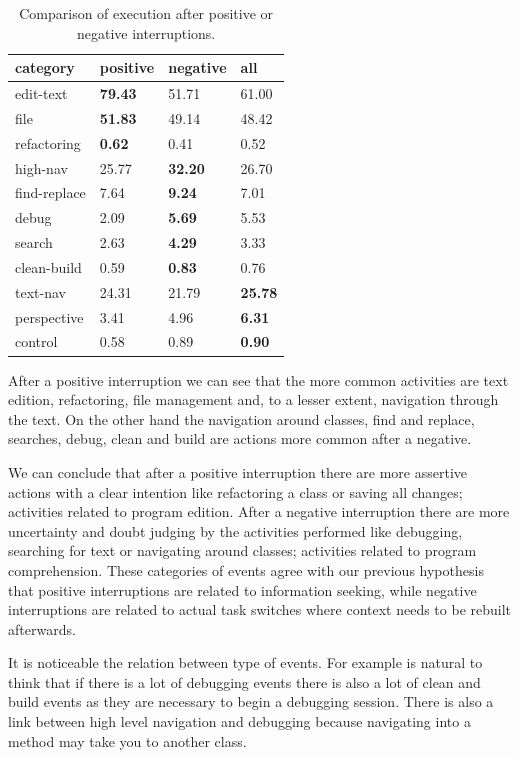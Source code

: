 \documentclass[times]{smrauth}
\begin{document}
\begin{table}[ht!]
\tiny
\renewcommand{\arraystretch}{1.3}
\caption{Comparison of execution after positive or negative interruptions. }
\label{tbl:stats_events}
\centering
\begin{tabular}{|p{2cm}|p{1cm} |p{1cm}|p{1cm}|} 
  \hline 
category & positive & negative & all \\  
  \hline 
    \hline 
edit-text &  \textbf{79.43} & 51.71 & 61.00 \\
file &  \textbf{51.83} & 49.14 & 48.42\\
refactoring & \textbf{0.62} & 0.41 & 0.52 \\
high-nav & 25.77 & \textbf{32.20} & 26.70  \\
find-replace & 7.64 & \textbf{9.24} & 7.01 \\
debug & 2.09 & \textbf{5.69} & 5.53  \\
search & 2.63 & \textbf{4.29} & 3.33 \\
clean-build & 0.59 & \textbf{0.83} & 0.76  \\
text-nav & 24.31 & 21.79 & \textbf{25.78} \\
perspective & 3.41 & 4.96 & \textbf{6.31}  \\
control & 0.58 & 0.89 & \textbf{0.90} \\
\hline
\end{tabular}
\end{table}

After a positive interruption we can see that the more common activities are text edition, refactoring, file management and, to a lesser extent, navigation through the text. On the other hand the navigation around classes, find and replace, searches, debug, clean and build are actions more common after a negative.

We can conclude that after a positive interruption there are more assertive actions with a clear intention like refactoring a class or saving all changes; activities related to program edition. After a negative interruption there are more uncertainty and doubt judging by the activities performed like debugging, searching for text or navigating around classes; activities related to program comprehension. These categories of events agree with our previous hypothesis that positive interruptions are related to information seeking, while negative interruptions are related to actual task switches where context needs to be rebuilt afterwards.

It is noticeable the relation between type of events. For example is natural to think that if there is a lot of debugging events there is also a lot of clean and build events as they are necessary to begin a debugging session. There is also a link between high level navigation and debugging because navigating into a method may take you to another class.
\end{document}
